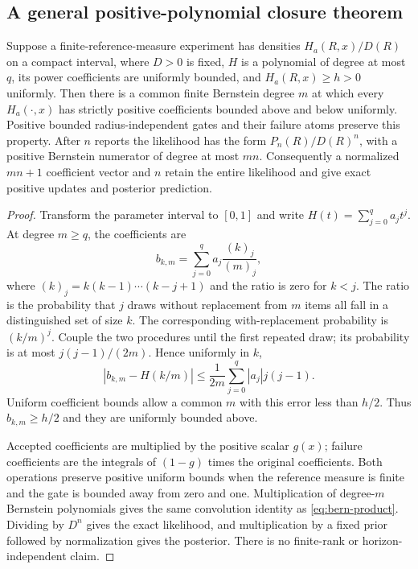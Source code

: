 \subsection{A general positive-polynomial closure theorem}
\begin{theorem}\label{thm:general}
Suppose a finite-reference-measure experiment has densities
$H_a(R,x)/D(R)$ on a compact interval, where $D>0$ is fixed, $H$ is a
polynomial of degree at most $q$, its power coefficients are uniformly
bounded, and $H_a(R,x)\ge h>0$ uniformly. Then there is a common finite
Bernstein degree $m$ at which every $H_a(\cdot,x)$ has strictly positive
coefficients bounded above and below uniformly. Positive bounded
radius-independent gates and their failure atoms preserve this property.
After $n$ reports the likelihood has the form
$P_n(R)/D(R)^n$, with a positive Bernstein numerator of degree at most $mn$.
Consequently a normalized $mn+1$ coefficient vector and $n$ retain the
entire likelihood and give exact positive updates and posterior prediction.
\end{theorem}
\begin{proof}
Transform the parameter interval to $[0,1]$ and write
$H(t)=\sum_{j=0}^q a_jt^j$. At degree $m\ge q$, the coefficients are
\[
 b_{k,m}=\sum_{j=0}^q a_j\frac{(k)_j}{(m)_j},
\]
where $(k)_j=k(k-1)\cdots(k-j+1)$ and the ratio is zero for $k<j$.
The ratio is the probability that $j$ draws without replacement from $m$
items all fall in a distinguished set of size $k$. The corresponding
with-replacement probability is $(k/m)^j$. Couple the two procedures until
the first repeated draw; its probability is at most $j(j-1)/(2m)$.
Hence uniformly in $k$,
\[
 |b_{k,m}-H(k/m)|\le
 \frac1{2m}\sum_{j=0}^q |a_j|j(j-1).
\]
Uniform coefficient bounds allow a common $m$ with this error less than
$h/2$. Thus $b_{k,m}\ge h/2$ and they are uniformly bounded above.

Accepted coefficients are multiplied by the positive scalar $g(x)$;
failure coefficients are the integrals of $(1-g)$ times the original
coefficients. Both operations preserve positive uniform bounds when the
reference measure is finite and the gate is bounded away from zero and one.
Multiplication of degree-$m$ Bernstein polynomials gives the same convolution
identity as \eqref{eq:bern-product}. Dividing by $D^n$ gives the exact
likelihood, and multiplication by a fixed prior followed by normalization
gives the posterior. There is no finite-rank or horizon-independent claim.
\end{proof}

